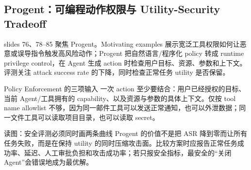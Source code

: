 \subsection{Progent：可编程动作权限与 Utility-Security Tradeoff}

slides 76、78--85 聚焦 Progent。Motivating examples 展示宽泛工具权限如何让恶意或误导指令触发高风险动作；Progent 把自然语言/程序化 policy 转成 runtime privilege control，在 Agent 生成 action 时检查用户目标、资源、参数和上下文。评测关注 attack success rate 的下降，同时检查正常任务 utility 是否保留。


\begin{importantbox}{Policy Enforcement 的三项输入}
一次 action 至少要结合：用户已经授权的目标、当前 Agent/工具拥有的 capability、以及资源与参数的具体上下文。仅按 tool name allowlist 不够，因为同一邮件工具可以发送正常通知，也可以外泄数据；同一文件工具可以读取项目目录，也可以读取 secret。
\end{importantbox}

\begin{knowledgebox}{读图：安全评测必须同时画两条曲线}
Progent 的价值不是把 ASR 降到零而让所有任务失败，而是在保持 utility 的同时压缩攻击面。比较方案时应报告正常任务成功率、延迟、人工审批负担和攻击成功率；若只报安全指标，最安全的“关闭 Agent”会错误地成为最优解。
\end{knowledgebox}

